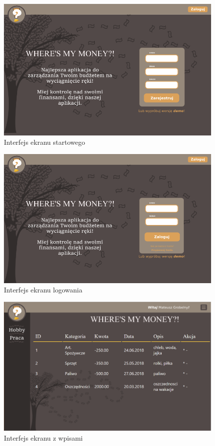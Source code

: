 \documentclass{article}
\begin{document}
	\begin{figure}[H]
		\includegraphics[scale=0.6]{assets/startowa.png}
		\caption[]{Interfejs ekranu startowego}
		\label{fig:start}
	\end{figure} 
	\begin{figure}[H]
		\includegraphics[scale=0.6]{assets/logowanie.png}
		\caption[]{Interfejs ekranu logowania}
		\label{fig:logowanie}
	\end{figure} 
	\begin{figure}[H]
		\includegraphics[scale=0.35]{assets/tabele.png}
		\caption[]{Interfejs ekranu z wpisami}
		\label{fig:tabele}
	\end{figure} 
\end{document}
